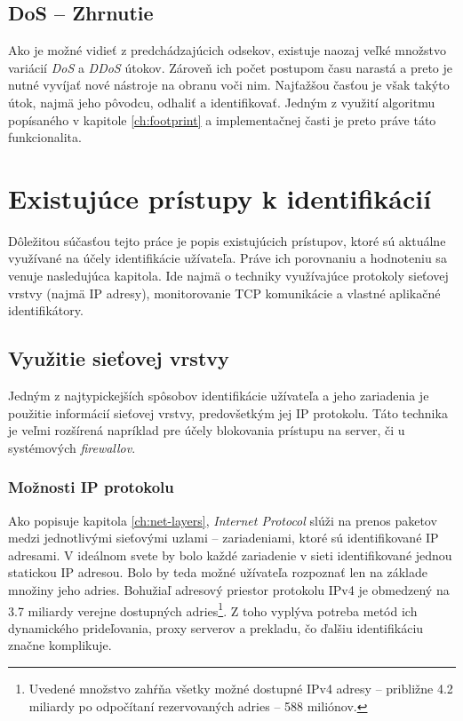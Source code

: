 \documentclass[
  digital, %
  table,   %
  lof,     %
  nolot,   %
  nocover
]{fithesis3}
\begin{document}
\section{DoS -- Zhrnutie}
Ako je možné vidieť z predchádzajúcich odsekov, existuje naozaj veľké množstvo
variácií \textit{DoS} a \textit{DDoS} útokov. Zároveň ich počet postupom času
narastá a preto je nutné vyvíjať nové nástroje na obranu voči nim. Najťažšou časťou
je však takýto útok, najmä jeho pôvodcu, odhaliť a identifikovať. Jedným z využití
algoritmu popísaného v kapitole \ref{ch:footprint} a implementačnej časti je preto
práve táto funkcionalita.

\chapter{Existujúce prístupy k identifikácií}
\label{ch:existing}
Dôležitou súčasťou tejto práce je popis existujúcich prístupov, ktoré
sú aktuálne využívané na účely identifikácie užívateľa. Práve ich porovnaniu
a hodnoteniu sa venuje nasledujúca kapitola.
Ide najmä o techniky využívajúce protokoly sieťovej vrstvy (najmä IP adresy),
monitorovanie TCP komunikácie a vlastné aplikačné identifikátory.

\section{Využitie sieťovej vrstvy}
Jedným z najtypickejších spôsobov identifikácie užívateľa a jeho zariadenia je
použitie informácií sieťovej vrstvy, predovšetkým jej IP protokolu.
Táto technika je veľmi rozšírená napríklad pre účely blokovania prístupu na
server, či u systémových \textit{firewallov}.

\subsection{Možnosti IP protokolu }
Ako popisuje kapitola \ref{ch:net-layers}, \textit{Internet Protocol} slúži na
prenos paketov medzi jednotlivými sieťovými uzlami -- zariadeniami, ktoré sú
identifikované IP adresami. V ideálnom svete by bolo každé zariadenie v sieti
identifikované jednou statickou IP adresou. Bolo by teda možné užívateľa
rozpoznať len na základe množiny jeho adries. Bohužiaľ adresový priestor
protokolu IPv4 je obmedzený na 3.7 miliardy verejne dostupných adries\footnote{
  Uvedené množstvo zahŕňa všetky možné dostupné IPv4 adresy -- približne 4.2
  miliardy po odpočítaní rezervovaných adries -- 588 miliónov.
}.
Z toho vyplýva potreba metód ich dynamického prideľovania, proxy serverov a
prekladu, čo ďalšiu identifikáciu značne komplikuje.
\end{document}
